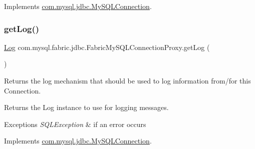 Implements \mbox{\hyperlink{interfacecom_1_1mysql_1_1jdbc_1_1_my_s_q_l_connection_aefbe0aa8c5652ee9534dd5354c8af220}{com.\+mysql.\+jdbc.\+My\+S\+Q\+L\+Connection}}.

\mbox{\label{classcom_1_1mysql_1_1fabric_1_1jdbc_1_1_fabric_my_s_q_l_connection_proxy_afacff16399aa5929d17910a44c76ee96}} 
\subsubsection{\texorpdfstring{get\+Log()}{getLog()}}
{\footnotesize\ttfamily \mbox{\hyperlink{interfacecom_1_1mysql_1_1jdbc_1_1log_1_1_log}{Log}} com.\+mysql.\+fabric.\+jdbc.\+Fabric\+My\+S\+Q\+L\+Connection\+Proxy.\+get\+Log (\begin{DoxyParamCaption}{ }\end{DoxyParamCaption})}

Returns the log mechanism that should be used to log information from/for this Connection.

\begin{DoxyReturn}{Returns}
the Log instance to use for logging messages. 
\end{DoxyReturn}

\begin{DoxyExceptions}{Exceptions}
{\em S\+Q\+L\+Exception} & if an error occurs \\
\hline
\end{DoxyExceptions}


Implements \mbox{\hyperlink{interfacecom_1_1mysql_1_1jdbc_1_1_my_s_q_l_connection_a3faf787772351caedf8e95f28c09c4cd}{com.\+mysql.\+jdbc.\+My\+S\+Q\+L\+Connection}}.

\mbox{\label{classcom_1_1mysql_1_1fabric_1_1jdbc_1_1_fabric_my_s_q_l_connection_proxy_aad58676ee781e3c04ec97545c95430cc}} 
